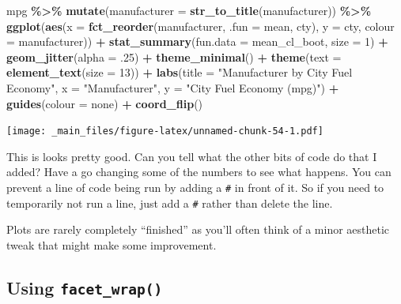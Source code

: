 \documentclass[
]{book}
\newenvironment{Shaded}{\begin{snugshade}}{\end{snugshade}}
\newcommand{\AttributeTok}[1]{\textcolor[rgb]{0.13,0.29,0.53}{#1}}
\newcommand{\DecValTok}[1]{\textcolor[rgb]{0.00,0.00,0.81}{#1}}
\newcommand{\FunctionTok}[1]{\textcolor[rgb]{0.13,0.29,0.53}{\textbf{#1}}}
\newcommand{\NormalTok}[1]{#1}
\newcommand{\SpecialCharTok}[1]{\textcolor[rgb]{0.81,0.36,0.00}{\textbf{#1}}}
\newcommand{\StringTok}[1]{\textcolor[rgb]{0.31,0.60,0.02}{#1}}
\begin{document}
\begin{Shaded}
\begin{Highlighting}[]
\NormalTok{mpg }\SpecialCharTok{\%\textgreater{}\%}
  \FunctionTok{mutate}\NormalTok{(}\AttributeTok{manufacturer =} \FunctionTok{str\_to\_title}\NormalTok{(manufacturer)) }\SpecialCharTok{\%\textgreater{}\%}
  \FunctionTok{ggplot}\NormalTok{(}\FunctionTok{aes}\NormalTok{(}\AttributeTok{x =} \FunctionTok{fct\_reorder}\NormalTok{(manufacturer, }\AttributeTok{.fun =}\NormalTok{ mean, cty), }\AttributeTok{y =}\NormalTok{ cty, }\AttributeTok{colour =}\NormalTok{ manufacturer)) }\SpecialCharTok{+}
  \FunctionTok{stat\_summary}\NormalTok{(}\AttributeTok{fun.data =}\NormalTok{ mean\_cl\_boot, }\AttributeTok{size =} \DecValTok{1}\NormalTok{) }\SpecialCharTok{+}
  \FunctionTok{geom\_jitter}\NormalTok{(}\AttributeTok{alpha =}\NormalTok{ .}\DecValTok{25}\NormalTok{) }\SpecialCharTok{+}
  \FunctionTok{theme\_minimal}\NormalTok{() }\SpecialCharTok{+}
  \FunctionTok{theme}\NormalTok{(}\AttributeTok{text =} \FunctionTok{element\_text}\NormalTok{(}\AttributeTok{size =} \DecValTok{13}\NormalTok{)) }\SpecialCharTok{+}
  \FunctionTok{labs}\NormalTok{(}\AttributeTok{title =} \StringTok{"Manufacturer by City Fuel Economy"}\NormalTok{,}
       \AttributeTok{x =} \StringTok{"Manufacturer"}\NormalTok{, }
       \AttributeTok{y =} \StringTok{"City Fuel Economy (mpg)"}\NormalTok{) }\SpecialCharTok{+}
  \FunctionTok{guides}\NormalTok{(}\AttributeTok{colour =} \StringTok{\textquotesingle{}none\textquotesingle{}}\NormalTok{) }\SpecialCharTok{+}
  \FunctionTok{coord\_flip}\NormalTok{()}
\end{Highlighting}
\end{Shaded}

\texttt{[image: \_main\_files/figure-latex/unnamed-chunk-54-1.pdf]}

This is looks pretty good. Can you tell what the other bits of code do that I added? Have a go changing some of the numbers to see what happens. You can prevent a line of code being run by adding a \texttt{\#} in front of it. So if you need to temporarily not run a line, just add a \texttt{\#} rather than delete the line.

Plots are rarely completely ``finished'' as you'll often think of a minor aesthetic tweak that might make some improvement.

\hypertarget{using-facet_wrap}{%
\subsection{\texorpdfstring{Using \texttt{facet\_wrap()}}{Using facet\_wrap()}}\label{using-facet_wrap}}
\end{document}
